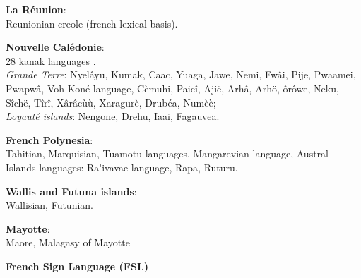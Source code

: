 \begin{multicols}{2}
{\bf La Réunion}:\\
Reunionian creole  (french lexical basis).

{\bf Nouvelle Calédonie}:\\
28 kanak languages .\\
{\it Grande Terre}: Nyelâyu, Kumak, Caac, Yuaga, Jawe, Nemi, Fwâi, Pije, Pwaamei, Pwapwâ, Voh-Koné language, Cèmuhi, Paicî, Ajië, Arhâ, Arhö, ôrôwe, Neku, Sîchë, Tîrî, Xârâcùù, Xaragurè, Drubéa, Numèè; \\
{\it Loyauté islands}: Nengone, Drehu, Iaai, Fagauvea.

{\bf French Polynesia}:\\
Tahitian, Marquisian, Tuamotu languages, Mangarevian language, Austral Islands languages: Ra{\mbox '}ivavae language, Rapa, Ruturu.

{\bf Wallis and Futuna islands}:\\
Wallisian, Futunian.

{\bf Mayotte}:\\
Maore, Malagasy of Mayotte

{\bf French Sign Language (FSL)}\\

\end{multicols}

\clearpage



